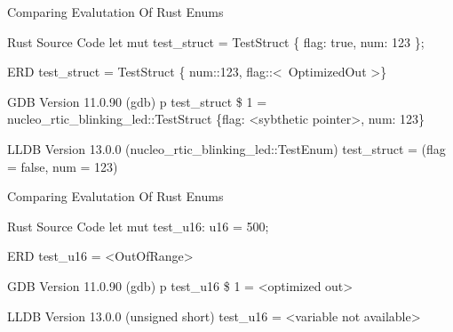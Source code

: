 
\begin{frame}{Comparing Evalutation Of Rust Enums}
	\begin{alertblock}{Rust Source Code}
		let mut test\_struct = TestStruct \{ flag: true, num: 123 \};
    	\end{alertblock}

	\begin{block}{ERD}
		test\_struct = TestStruct \{ num::123, flag::\textless \ OptimizedOut \textgreater \}
    	\end{block}

    	\begin{block}{GDB Version 11.0.90}
		(gdb) p test\_struct\newline
		\$ 1 = nucleo\_rtic\_blinking\_led::TestStruct \{flag: \textless sybthetic pointer\textgreater, num: 123\}
    	\end{block}

    	\begin{block}{LLDB Version 13.0.0}
		(nucleo\_rtic\_blinking\_led::TestEnum) test\_struct = (flag = false, num = 123)
    	\end{block}
\end{frame}


\begin{frame}{Comparing Evalutation Of Rust Enums}
	\begin{alertblock}{Rust Source Code}
		let mut test\_u16: u16 = 500;
    	\end{alertblock}

	\begin{block}{ERD}
		test\_u16 = \textless OutOfRange\textgreater
    	\end{block}

    	\begin{block}{GDB Version 11.0.90}
		(gdb) p test\_u16\newline
		\$ 1 = \textless optimized out\textgreater
    	\end{block}

    	\begin{block}{LLDB Version 13.0.0}
		(unsigned short) test\_u16 = \textless variable not available\textgreater
    	\end{block}
\end{frame}


